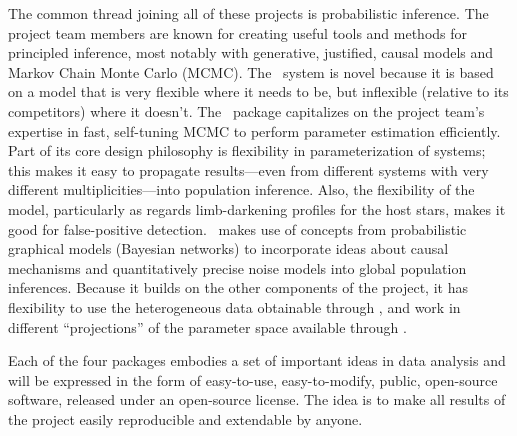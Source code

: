 \documentclass[letterpaper,12pt]{article}
\newcommand{\kplr}{\package{kplr}}
\newcommand{\Untrendy}{\package{Untrendy}}
\newcommand{\Bart}{\package{Bart}}
\newcommand{\TheCreator}{\package{TheCreator}}
\begin{document}
The common thread joining all of these projects is probabilistic
inference.  The project team members are known for creating useful
tools and methods for principled inference, most notably with
generative, justified, causal models and Markov Chain Monte Carlo
(MCMC).  The \Untrendy\ system is novel because it is based on a model
that is very flexible where it needs to be, but inflexible (relative
to its competitors) where it doesn't.  The \Bart\ package capitalizes
on the project team's expertise in fast, self-tuning MCMC to perform
parameter estimation efficiently.  Part of its core design philosophy
is flexibility in parameterization of systems; this makes it easy to
propagate results---even from different systems with very different
multiplicities---into population inference.  Also, the flexibility of
the model, particularly as regards limb-darkening profiles for the
host stars, makes it good for false-positive detection.
\TheCreator\ makes use of concepts from probabilistic graphical models
(Bayesian networks) to incorporate ideas about causal mechanisms and
quantitatively precise noise models into global population inferences.
Because it builds on the other components of the project, it has
flexibility to use the heterogeneous data obtainable through \kplr,
and work in different ``projections'' of the parameter space available
through \Bart.

Each of the four packages embodies a set of important ideas in data
analysis and will be expressed in the form of easy-to-use,
easy-to-modify, public, open-source software, released under an
open-source license.  The idea is to make all results of the project
easily reproducible and extendable by anyone.
\end{document}
